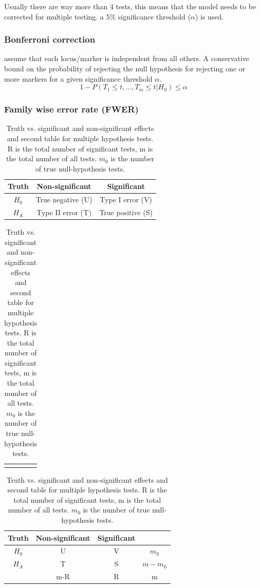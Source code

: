 \documentclass{article}
\begin{document}
Usually there are way more than 4 tests, this means that the model needs to be corrected for multiple testing. a 5\% significance threshold ($\alpha$) is used.

\subsubsection{Bonferroni correction}
assume that each locus/marker is independent from all others. A conservative bound on the probability of rejecting the null hypothesis for rejecting one or more markers for a given significance threshold $\alpha$.
\begin{equation*}
1-P(T_1 \leq t, ..., T_m \leq t|H_0) \leq \alpha
\end{equation*}


\subsubsection{Family wise error rate (FWER)}

\renewcommand{\arraystretch}{1.75}
\begin{table}[H]
\centering
\caption{Truth vs. significant and non-significant effects and second table for multiple hypothesis tests. R is the total number of significant tests, m is the total number of all tests. $m_0$ is the number of true null-hypothesis tests.}
\begin{tabular}{c|c|c}
Truth & Non-significant & Significant \\
\hline
$H_0$ & True negative (U) & Type I error (V) \\
\hline 
$H_A$ &Type II error (T) & True positive (S)
\end{tabular}
\begin{tabular}{c c}
                             \hspace{10cm}    &                                            
\end{tabular}

\begin{tabular}{c|c|c|c}
Truth & Non-significant & Significant \\
\hline
$H_0$ & U & V & $m_0$ \\
\hline 
$H_A$ &T & S & $m-m_0$ \\
\hline 
& m-R & R &m

\end{tabular}
\end{table}
\renewcommand{\arraystretch}{1}
\end{document}
